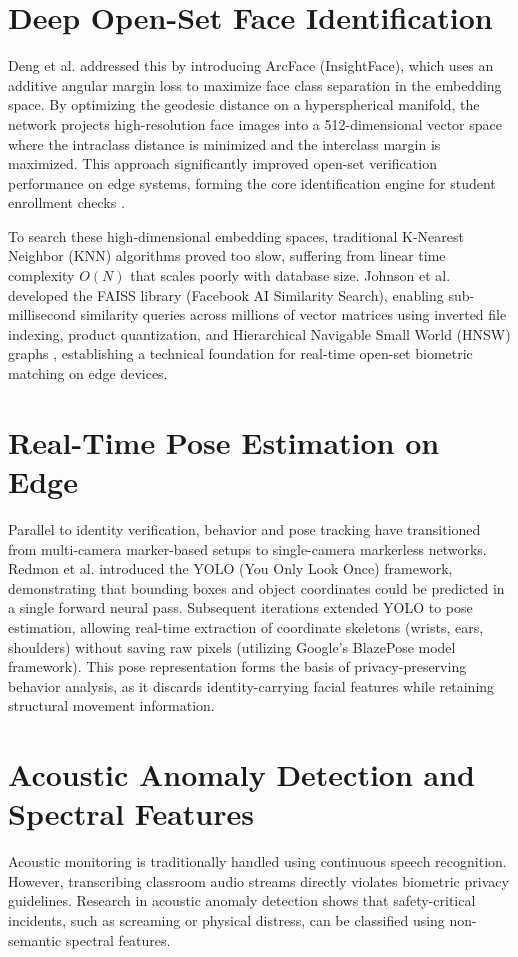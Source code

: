 \documentclass[12pt,a4paper,oneside]{report}
\begin{document}
\section{Deep Open-Set Face Identification}
Deng et al. \cite{deng2019arcface} addressed this by introducing ArcFace (InsightFace), which uses an additive angular margin loss to maximize face class separation in the embedding space. By optimizing the geodesic distance on a hyperspherical manifold, the network projects high-resolution face images into a 512-dimensional vector space where the intraclass distance is minimized and the interclass margin is maximized. This approach significantly improved open-set verification performance on edge systems, forming the core identification engine for student enrollment checks \cite{cosface2018}.

To search these high-dimensional embedding spaces, traditional K-Nearest Neighbor (KNN) algorithms proved too slow, suffering from linear time complexity $O(N)$ that scales poorly with database size. Johnson et al. \cite{johnson2019billion} developed the FAISS library (Facebook AI Similarity Search), enabling sub-millisecond similarity queries across millions of vector matrices using inverted file indexing, product quantization, and Hierarchical Navigable Small World (HNSW) graphs \cite{li2020ann}, establishing a technical foundation for real-time open-set biometric matching on edge devices.

\section{Real-Time Pose Estimation on Edge}
Parallel to identity verification, behavior and pose tracking have transitioned from multi-camera marker-based setups to single-camera markerless networks. Redmon et al. \cite{redmon2016you} introduced the YOLO (You Only Look Once) framework, demonstrating that bounding boxes and object coordinates could be predicted in a single forward neural pass. Subsequent iterations extended YOLO to pose estimation, allowing real-time extraction of coordinate skeletons (wrists, ears, shoulders) without saving raw pixels \cite{cao2021openpose, sun2019hrnet} (utilizing Google's BlazePose model framework). This pose representation forms the basis of privacy-preserving behavior analysis, as it discards identity-carrying facial features while retaining structural movement information.

\section{Acoustic Anomaly Detection and Spectral Features}
Acoustic monitoring is traditionally handled using continuous speech recognition. However, transcribing classroom audio streams directly violates biometric privacy guidelines. Research in acoustic anomaly detection shows that safety-critical incidents, such as screaming or physical distress, can be classified using non-semantic spectral features.
\end{document}
